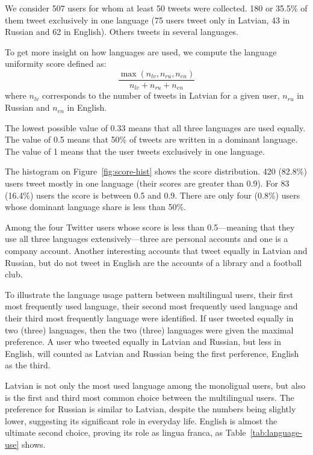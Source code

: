 \documentclass[11pt,a4paper]{article}
\begin{document}
We consider 507 users for whom at least 50 tweets were collected. 180 or 35.5\% of them tweet exclusively in one language (75 users tweet only in Latvian, 43 in Russian and 62 in English). Others tweets in several languages.

To get more insight on how languages are used, we compute the language uniformity score defined as:
\begin{equation}
  \label{eq:score}
  \frac{\max(n_\mathit{lv}, n_\mathit{ru}, n_\mathit{en})}{n_\mathit{lv} + n_\mathit{ru} + n_\mathit{en}}
\end{equation}
where $n_\mathit{lv}$ corresponds to the number of tweets in Latvian for a given user, $n_\mathit{ru}$ in Russian and $n_\mathit{en}$ in English.

The lowest possible value of 0.33 means that all three languages are used equally. The value of 0.5 means that 50\% of tweets are written in a dominant language. The value of 1 means that the user tweets exclusively in one language.

The histogram on Figure~\ref{fig:score-hist} shows the score distribution. 420 (82.8\%) users tweet mostly in one language (their scores are greater than 0.9). For 83  (16.4\%) users the score is between 0.5 and 0.9. There are only four (0.8\%) users whose dominant language share is less than 50\%.

Among the four Twitter users whose score is less than 0.5---meaning that they use all three languages extensively---three are personal accounts and one is a company account. Another interesting accounts that tweet equally in Latvian and Russian, but do not tweet in English are the accounts of a library and a football club.

To illustrate the language usage pattern between multilingual users, their first most frequently used language, their second most frequently used language and their third most frequently language were identified. If user tweeted equally in two (three) languages, then the two (three) languages were given the maximal preference. A user who tweeted equally in Latvian and Russian, but less in English, will counted as Latvian and Russian being the first perference, English as the third.

Latvian is not only the most used language among the monoligual users, but also is the first and third most common choice between the multilingual users. The preference for Russian is similar to Latvian, despite the numbers being slightly lower, suggesting its significant role in everyday life. English is almost the ultimate second choice, proving its role as lingua franca, as Table~\ref{tab:language-use} shows.
\end{document}
